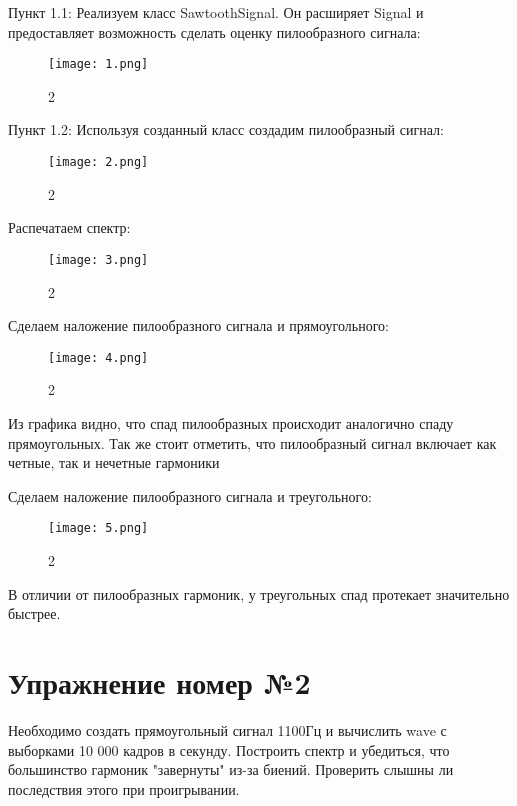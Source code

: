 \documentclass[10pt,a4paper,oneside]{article}
\begin{document}
Пункт 1.1:
Реализуем класс SawtoothSignal. Он расширяет Signal и предоставляет возможность сделать оценку пилообразного сигнала:

\begin{figure}[H]
        \centering
        \texttt{[image: 1.png]}
        \caption{2}
        \label{fig:first}
\end{figure}

Пункт 1.2:
Используя созданный класс создадим пилообразный сигнал: 

\begin{figure}[H]
        \centering
        \texttt{[image: 2.png]}
        \caption{2}
        \label{fig:first}
\end{figure}

Распечатаем спектр: 

\begin{figure}[H]
        \centering
        \texttt{[image: 3.png]}
        \caption{2}
        \label{fig:first}
\end{figure}

Сделаем наложение пилообразного сигнала и прямоугольного:

\begin{figure}[H]
        \centering
        \texttt{[image: 4.png]}
        \caption{2}
        \label{fig:first}
\end{figure}

Из графика видно, что спад пилообразных происходит аналогично спаду прямоугольных. Так же стоит отметить, что пилообразный сигнал включает как четные, так и нечетные гармоники

Сделаем наложение пилообразного сигнала и треугольного: 

\begin{figure}[H]
        \centering
        \texttt{[image: 5.png]}
        \caption{2}
        \label{fig:first}
\end{figure}

В отличии от пилообразных гармоник, у треугольных спад протекает значительно быстрее.
\section{Упражнение номер №2}
Необходимо создать прямоугольный сигнал 1100Гц и вычислить wave с выборками 10 000 кадров в секунду.  Построить спектр и убедиться, что большинство гармоник "завернуты" из-за биений. Проверить слышны ли последствия этого при проигрывании.
\end{document}
